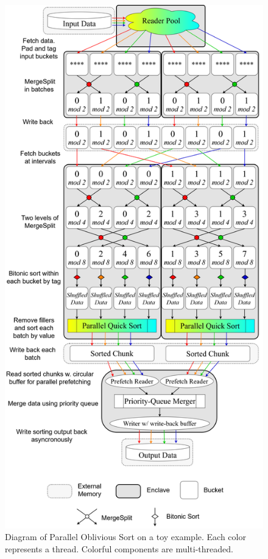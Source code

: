 \documentclass[final,hyperref={pdfpagelabels=false}]{beamer}
\begin{document}
\begin{frame}
\begin{columns}[t]
  \begin{column}{.25\linewidth}
    \begin{figure}
      \includegraphics[width=\linewidth]{assets/parosort.png}
      \caption{Diagram of Parallel Oblivious Sort on a toy example. Each color represents a thread. Colorful components are multi-threaded.}
    \end{figure}
  \end{column}
  \end{columns}
\end{frame}
\end{document}
